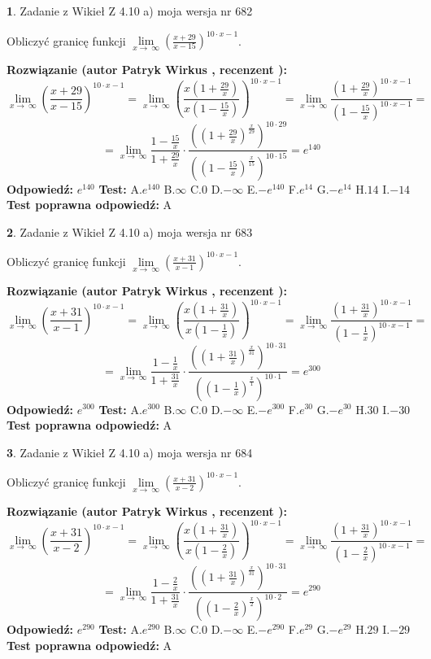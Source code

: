 \documentclass[12pt, a4paper]{article}
\theoremstyle{definition} %
\newtheorem{zad}{}
\newcommand{\zadStart}[1]{\begin{zad}#1\newline}
\newcommand{\zadStop}{\end{zad}}
\newcommand{\rozwStart}[2]{\noindent \textbf{Rozwiązanie (autor #1 , recenzent #2): }\newline}
\newcommand{\rozwStop}{\newline}
\newcommand{\odpStart}{\noindent \textbf{Odpowiedź:}\newline}
\newcommand{\odpStop}{\newline}
\newcommand{\testStart}{\noindent \textbf{Test:}\newline}
\newcommand{\testStop}{\newline}
\newcommand{\kluczStart}{\noindent \textbf{Test poprawna odpowiedź:}\newline}
\newcommand{\kluczStop}{\newline}
\begin{document}
\zadStart{Zadanie z Wikieł Z 4.10 a) moja wersja nr 682}

Obliczyć granicę funkcji  $\lim\limits_{x\to\ \infty}(\frac{x+29}{x-15})^{10\cdot x-1}$.
\zadStop
\rozwStart{Patryk Wirkus}{}
$$\lim\limits_{x\to\ \infty}(\frac{x+29}{x-15})^{10\cdot x-1} = \lim\limits_{x\to\ \infty}(\frac{x(1+\frac{29}{x})}{x(1-\frac{15}{x})})^{10\cdot x-1}=\lim\limits_{x\to\ \infty}\frac{(1+\frac{29}{x})^{10\cdot x-1}}{(1-\frac{15}{x})^{10\cdot x-1}}=$$
$$=\lim\limits_{x\to\ \infty}\frac{1-\frac{15}{x}}{1+\frac{29}{x}}\cdot\frac{((1+\frac{29}{x})^{\frac{x}{29}})^{10\cdot29}}{((1-\frac{15}{x})^{\frac{x}{15}})^{10\cdot15}}=e^{140}$$
\rozwStop
\odpStart
$e^{140}$
\odpStop
\testStart
A.$e^{140}$ B.$\infty$ C.$0$ D.$-\infty$ E.$-e^{140}$
F.$e^{14}$ G.$-e^{14}$
H.$14$
I.$-14$
\testStop
\kluczStart
A
\kluczStop



\zadStart{Zadanie z Wikieł Z 4.10 a) moja wersja nr 683}

Obliczyć granicę funkcji  $\lim\limits_{x\to\ \infty}(\frac{x+31}{x-1})^{10\cdot x-1}$.
\zadStop
\rozwStart{Patryk Wirkus}{}
$$\lim\limits_{x\to\ \infty}(\frac{x+31}{x-1})^{10\cdot x-1} = \lim\limits_{x\to\ \infty}(\frac{x(1+\frac{31}{x})}{x(1-\frac{1}{x})})^{10\cdot x-1}=\lim\limits_{x\to\ \infty}\frac{(1+\frac{31}{x})^{10\cdot x-1}}{(1-\frac{1}{x})^{10\cdot x-1}}=$$
$$=\lim\limits_{x\to\ \infty}\frac{1-\frac{1}{x}}{1+\frac{31}{x}}\cdot\frac{((1+\frac{31}{x})^{\frac{x}{31}})^{10\cdot31}}{((1-\frac{1}{x})^{\frac{x}{1}})^{10\cdot1}}=e^{300}$$
\rozwStop
\odpStart
$e^{300}$
\odpStop
\testStart
A.$e^{300}$ B.$\infty$ C.$0$ D.$-\infty$ E.$-e^{300}$
F.$e^{30}$ G.$-e^{30}$
H.$30$
I.$-30$
\testStop
\kluczStart
A
\kluczStop



\zadStart{Zadanie z Wikieł Z 4.10 a) moja wersja nr 684}

Obliczyć granicę funkcji  $\lim\limits_{x\to\ \infty}(\frac{x+31}{x-2})^{10\cdot x-1}$.
\zadStop
\rozwStart{Patryk Wirkus}{}
$$\lim\limits_{x\to\ \infty}(\frac{x+31}{x-2})^{10\cdot x-1} = \lim\limits_{x\to\ \infty}(\frac{x(1+\frac{31}{x})}{x(1-\frac{2}{x})})^{10\cdot x-1}=\lim\limits_{x\to\ \infty}\frac{(1+\frac{31}{x})^{10\cdot x-1}}{(1-\frac{2}{x})^{10\cdot x-1}}=$$
$$=\lim\limits_{x\to\ \infty}\frac{1-\frac{2}{x}}{1+\frac{31}{x}}\cdot\frac{((1+\frac{31}{x})^{\frac{x}{31}})^{10\cdot31}}{((1-\frac{2}{x})^{\frac{x}{2}})^{10\cdot2}}=e^{290}$$
\rozwStop
\odpStart
$e^{290}$
\odpStop
\testStart
A.$e^{290}$ B.$\infty$ C.$0$ D.$-\infty$ E.$-e^{290}$
F.$e^{29}$ G.$-e^{29}$
H.$29$
I.$-29$
\testStop
\kluczStart
A
\kluczStop
\end{document}
